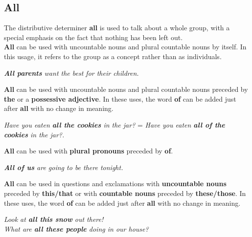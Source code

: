 \documentclass[hidelinks,10pt,a4paper]{article}
\begin{document}
\subsection{All}
The distributive determiner \textbf{all} is used to talk about a whole group, with a special emphasis on the fact that nothing has been left out.\\
\indent \textbf{All} can be used with uncountable nouns and plural countable nouns by itself. In this usage, it refers to the group as a concept rather than as individuals.
\begin{center}
\textit{ \textbf{All parents} want the best for their children.}
\end{center}
\textbf{All} can be used with uncountable nouns and plural countable nouns preceded by \textbf{the} or a \textbf{possessive adjective}. In these uses, the word \textbf{of} can be added just after \textbf{all} with no change in meaning.
\begin{center}
\textit{ Have you eaten \textbf{all the cookies} in the jar?} = \textit{Have you eaten \textbf{all of the cookies} in the jar?.}
\end{center}
\textbf{All} can be used with \textbf{plural pronouns} preceded by \textbf{of}.
\begin{center}
\textit{ \textbf{All of us} are going to be there tonight.}
\end{center}
\textbf{All} can be used in questions and exclamations with \textbf{uncountable nouns} preceded by \textbf{this/that} or with \textbf{countable nouns} preceded by \textbf{these/those}.  In these uses, the word \textbf{of} can be added just after \textbf{all} with no change in meaning.
\begin{center}
\textit{ Look at \textbf{all this snow} out there!\\
What are \textbf{all these people} doing in our house?}
\end{center}
\end{document}
